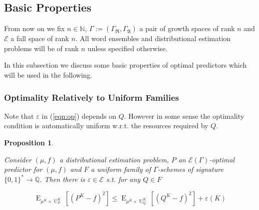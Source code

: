 \documentclass{article}
\numberwithin{equation}{section}
\theoremstyle{definition}
\theoremstyle{plain}
\newtheorem{proposition}{Proposition}[section]
\newcommand{\Bool}{\{0,1\}}
\newcommand{\Words}{{\Bool^*}}
\DeclareMathOperator{\E}{E}
\DeclareMathOperator{\Un}{U}
\newcommand{\Nats}{\mathbb{N}}
\newcommand{\Rats}{\mathbb{Q}}
\newcommand{\GrowR}{\Gamma_{\mathfrak{R}}}
\newcommand{\GrowA}{\Gamma_{\mathfrak{A}}}
\newcommand{\Grow}{\Gamma:=(\GrowR,\GrowA)}
\newcommand{\Fall}{\mathcal{E}}
\newcommand{\EG}{\Fall(\Gamma)}
\begin{document}
\subsection{Basic Properties}

From now on we fix $n \in \Nats$, $\Grow$ a pair of growth spaces of rank $n$ and $\Fall$ a fall space of rank $n$. All word ensembles and distributional estimation problems will be of rank ${n}$ unless specified otherwise.

In this subsection we discuss some basic properties of optimal predictors which will be used in the following.

\subsubsection{Optimality Relatively to Uniform Families}

Note that $\varepsilon$ in (\ref{eqn:op}) depends on $Q$. However in some sense the optimality condition is automatically uniform w.r.t. the resources required by $Q$.

\begin{proposition}
\label{prp:unif}

Consider $(\mu,f)$ a distributional estimation problem, $P$ an $\EG$-optimal predictor for $(\mu,f)$ and $F$ a uniform family of $\Gamma$-schemes of signature $\Words \rightarrow \Rats$. Then there is $\varepsilon \in \Fall$ s.t. for any $Q \in F$

\begin{equation}
\E_{\mu^{K} \times \Un_P^{K}}[(P^{K} - f)^2] \leq \E_{\mu^{K} \times \Un_Q^{K}}[(Q^{K} - f)^2] + \varepsilon(K)
\end{equation}

\end{proposition}
\end{document}
